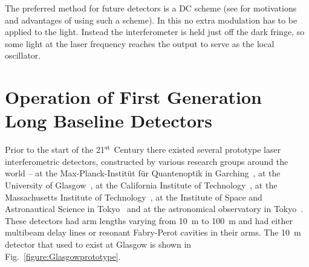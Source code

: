 \documentclass{article}
\begin{document}
The preferred method for future detectors is a DC scheme (see
\cite{Fritschel:2003, Ward:2008, Hild:2009} for motivations and advantages of
using such a scheme). In this no extra modulation has to be applied to the
light. Instead the interferometer is held just off the dark fringe, so some
light at the laser frequency reaches the output to serve as the local
oscillator.


\newpage

\section{Operation of First Generation Long Baseline Detectors}
\label{section:construction}

Prior to the start of the 21$^{\rm st}$ Century there existed several prototype
laser interferometric detectors, constructed by various research groups around
the world -- at the Max-Planck-Instit\"ut f\"ur Quantenoptik in
Garching~\cite{Shoemaker}, at the University of Glasgow~\cite{Robertson}, at the
California Institute of Technology~\cite{Abramovici}, at the Massachusetts
Institute of Technology~\cite{Fritschel2}, at the Institute of Space and
Astronautical Science in Tokyo~\cite{Mizuno} and at the astronomical observatory
in Tokyo~\cite{Araya}. These detectors had arm lengths varying from 10~m to
100~m and had either multibeam delay lines or resonant Fabry-Perot cavities in
their arms.  The 10~m detector that used to exist at Glasgow is shown in
Fig.~\ref{figure:Glasgowprototype}.

\end{document}

